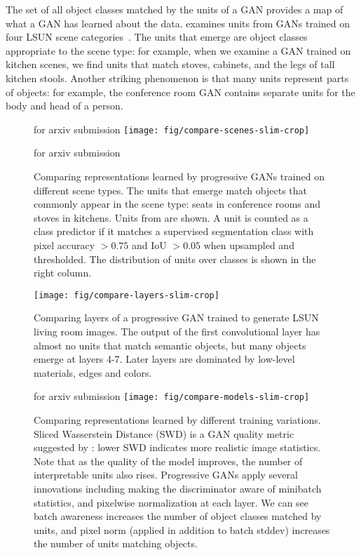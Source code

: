 \documentclass{article} %
\def\arxiv{for arxiv submission}
\begin{document}
The set of all object classes matched by the units of a GAN provides a map of what a GAN has learned about the data.  examines units from GANs trained on four LSUN scene categories~\citep{yu2015lsun}. The units that emerge are object classes appropriate to the scene type: for example, when we examine a GAN trained on kitchen scenes, we find units that match stoves, cabinets, and the legs of tall kitchen stools.  Another striking phenomenon is that many units represent parts of objects: for example, the conference room GAN contains separate units for the body and head of a person. 
\begin{figure}
\ifdefined\arxiv
\vspace{-15pt}
\fi
\centering
\texttt{[image: fig/compare-scenes-slim-crop]}
\vspace{-11pt}
\caption{Comparing representations learned by progressive GANs trained on different scene types.  The units that emerge match objects that commonly appear in the scene type: seats in conference rooms and stoves in kitchens.  Units from  are shown.  A unit is counted as a class predictor if it matches a supervised segmentation class with pixel accuracy $> 0.75$ and IoU $> 0.05$ when upsampled and thresholded. The distribution of units over classes is shown in the right column.}
\ifdefined\arxiv
\vspace{-5pt}
\else
\vspace{-10pt}
\fi
\end{figure}\begin{figure}[t]
\hspace{3mm}\texttt{[image: fig/compare-layers-slim-crop]}
\vspace{-10pt}
\caption{Comparing layers of a progressive GAN trained to generate LSUN living room images. The output of the first convolutional layer has almost no units that match semantic objects, but many objects emerge at layers 4-7.  Later layers are dominated by low-level materials, edges and colors.}
\end{figure}\begin{figure}[t]
\ifdefined\arxiv
\vspace{-25pt}
\else
\fi
\hspace{3mm}\texttt{[image: fig/compare-models-slim-crop]}
\vspace{-10pt}
\caption{Comparing  representations learned by different training variations. Sliced Wasserstein Distance (SWD) is a GAN quality metric suggested by \cite{karras2018progressive}: lower SWD indicates more realistic image statistics.  Note that as the quality of the model improves, the number of interpretable units also rises.  Progressive GANs apply several innovations including making the discriminator aware of minibatch statistics, and pixelwise normalization at each layer.  We can see batch awareness increases the number of object classes matched by units, and pixel norm (applied in addition to batch stddev) increases the number of units matching objects.}

\end{figure}
\end{document}
